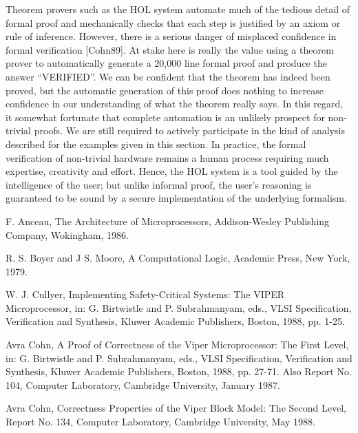 \begin{normalsize}
Theorem provers such as the HOL system
automate much of the tedious detail of formal proof and
mechanically checks that each step is justified
by an axiom or rule of inference.
However, there is a serious danger of misplaced confidence in
formal verification [Cohn89].
At stake here is really the value using a theorem prover to
automatically generate a 20,000 line formal proof and produce
the answer ``VERIFIED''.
We can be confident that the theorem has indeed been proved, but
the automatic generation of this proof does nothing
to increase confidence in our understanding of what the theorem
really says.
In this regard, it somewhat fortunate that complete automation
is an unlikely prospect for non-trivial proofs.
We are still required to actively participate in the kind of
analysis described for the examples given in this section.
In practice, the formal verification of non-trivial hardware
remains a human process requiring much expertise,
creativity and effort.
Hence, the HOL system is a tool guided by the intelligence of the user;
but unlike informal proof,
the user's reasoning is guaranteed to be sound
by a secure implementation of the underlying formalism.

\newpage
\begin{thebibliography}{12}

\setlength{\parskip}{0mm}

F. Anceau,
The Architecture of Microprocessors,
Addison-Wesley Publishing Company, Wokingham, 1986.

R. S. Boyer and J S. Moore,
A Computational Logic,
Academic Press, New York, 1979.

W. J. Cullyer,
Implementing Safety-Critical Systems:  The VIPER Microprocessor, in:
G. Birtwistle and P. Subrahmanyam, eds.,
VLSI Specification, Verification and Synthesis,
Kluwer Academic Publishers, Boston, 1988,
pp. 1-25.

Avra Cohn,
A Proof of Correctness of the Viper Microprocessor:  The First Level, in:
G. Birtwistle and P. Subrahmanyam, eds.,
VLSI Specification, Verification and Synthesis,
Kluwer Academic Publishers, Boston, 1988,
pp. 27-71.
Also Report No. 104, Computer Laboratory, Cambridge University,
January 1987.

Avra Cohn,
Correctness Properties of the Viper Block Model:  The Second Level,
Report No. 134, Computer Laboratory, Cambridge University,
May 1988.


\end{thebibliography}
\end{normalsize}
